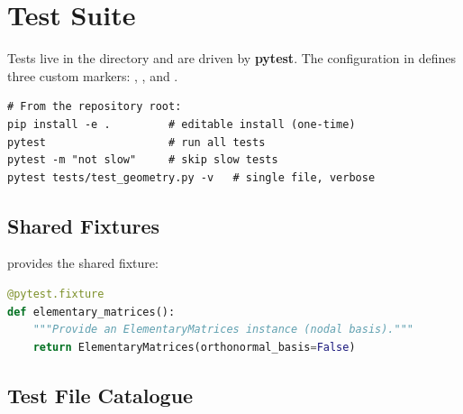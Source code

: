 \section{Test Suite}
\label{sec:test_suite}

Tests live in the  directory and are driven by \textbf{pytest}.
The configuration in  defines three custom markers:
, , and .

\begin{lstlisting}[caption={Running the test suite}]
# From the repository root:
pip install -e .         # editable install (one-time)
pytest                   # run all tests
pytest -m "not slow"     # skip slow tests
pytest tests/test_geometry.py -v   # single file, verbose
\end{lstlisting}

\subsection{Shared Fixtures}

 provides the shared fixture:

\begin{lstlisting}[language=Python, caption={Shared pytest fixture}]
@pytest.fixture
def elementary_matrices():
    """Provide an ElementaryMatrices instance (nodal basis)."""
    return ElementaryMatrices(orthonormal_basis=False)
\end{lstlisting}

\subsection{Test File Catalogue}

